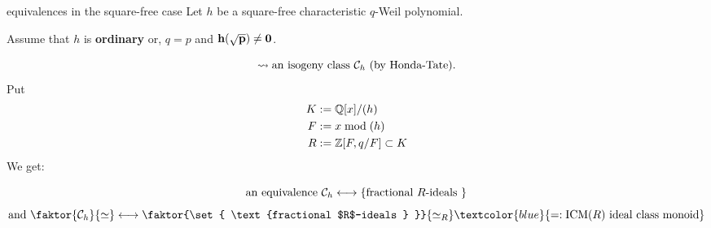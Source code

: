 \documentclass[usenames,dvipsnames]{beamer}
\begin{document}
\begin{frame}{ equivalences in the square-free case}
Let $h$ be a square-free characteristic $q$-Weil polynomial.

Assume that $h$ is \textbf{ordinary} or, $q=p$ and $\bf{h(\sqrt{p})\neq 0}$.

\[\rightsquigarrow \text{an isogeny class ${\mathcal C}_h$ (by Honda-Tate)}.\]
\pause Put
\begin{align*}
 K &:= \mathbb{Q}[x]/(h)\\
 F &:= x \bmod (h)\\
 R &:= \mathbb{Z}[F,q/F] \subset K
\end{align*}
\pause We get:
\begin{theorem}[M.]
\[ \text{an equivalence } {\mathcal C}_h \longleftrightarrow \left\lbrace \text{fractional $R$-ideals } \right\rbrace \]
\[ \text{and } \faktor{\cC_h}{\simeq} \longleftrightarrow \faktor{\set{ \text{fractional $R$-ideals } }}{\simeq_R} \textcolor{blue}{=:\ICM(R) \text{ ideal class monoid}} \]

\end{theorem}
\end{frame}
\end{document}

